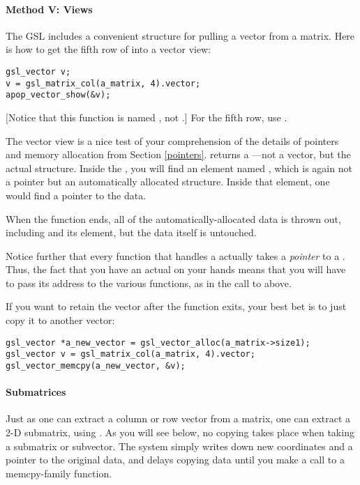\paragraph{Method V: Views}
The GSL includes a convenient structure for pulling a vector from a
matrix. Here is how to get the fifth row of  into a vector view:

\begin{lstlisting}
gsl_vector v;
v = gsl_matrix_col(a_matrix, 4).vector;
apop_vector_show(&v);
\end{lstlisting}
[Notice that this function is named , not .]
For the fifth row, use . 

The vector view is a nice test of your comprehension of the details of
pointers and memory allocation from Section \ref{pointers}.
 returns a
---not a vector, but the actual
structure.  Inside the , you will find 
an element named , which is again not a pointer but an
automatically allocated structure. Inside that 
element, one would find a pointer to the data.

When the function ends, all of the automatically-allocated data is
thrown out, including  and its
 element, but the data itself is untouched.

Notice further that every function that handles a
 actually takes a {\em pointer} to a 
. Thus, the fact that you have an actual 
 on your hands means that you will have to pass
its address to the various functions, as in the call to
 above.

If you want to retain the vector after the function exits, your best bet
is to just copy it to another vector:

\begin{lstlisting}
gsl_vector *a_new_vector = gsl_vector_alloc(a_matrix->size1);
gsl_vector v = gsl_matrix_col(a_matrix, 4).vector;
gsl_vector_memcpy(a_new_vector, &v);
\end{lstlisting}

\paragraph{Submatrices} Just as one can extract a column or row
vector from a matrix, one can extract a 2-D submatrix, using
. As you will see below, no copying takes
place when taking a submatrix or subvector. The system simply writes
down new coordinates and a pointer to the original data, and delays
copying data until you make a call to a {\ci memcpy}-family function. 

